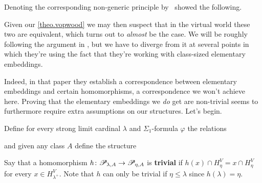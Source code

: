 \documentclass[../../main]{subfiles}
\begin{document}
Denoting the corresponding non-generic principle by \wvp\, \cite{WilsonWVP} showed the following.


Given our \ref{theo.vopwood} we may then suspect that in the virtual world these two are equivalent, which turns out to \textit{almost} be the case. We will be roughly following the argument in \cite{WilsonWVP}, but we have to diverge from it at several points in which they're using the fact that they're working with class-sized elementary embeddings. 

\qquad Indeed, in that paper they establish a correspondence between elementary embeddings and certain homomorphisms, a correspondence we won't achieve here. Proving that the elementary embeddings we \textit{do} get are non-trivial seems to furthermore require extra assumptions on our structures. Let's begin.

\qquad Define for every strong limit cardinal $\lambda$ and $\Sigma_1$-formula $\varphi$ the relations

and given any class $A$ define the structure

Say that a homomorphism $h\colon\mathscr P_{\lambda,A}\to\mathscr P_{\eta,A}$ is \textbf{trivial} if $h(x)\cap H_\eta^V = x\cap H_\eta^V$ for every $x\in H_{\lambda^+}^V$. Note that $h$ can only be trivial if $\eta\leq\lambda$ since $h(\lambda)=\eta$.
\end{document}
